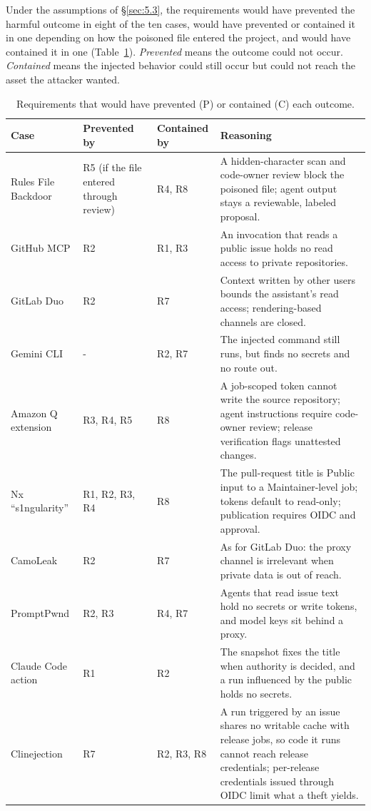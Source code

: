 \documentclass[acmsmall,screen,review]{acmart}
\begin{document}
Under the assumptions of \S\ref{sec:5.3}, the requirements would have prevented the harmful outcome in eight of the ten cases, would have prevented or contained it in one depending on how the poisoned file entered the project, and would have contained it in one (Table~\ref{tab:4}). \emph{Prevented} means the outcome could not occur. \emph{Contained} means the injected behavior could still occur but could not reach the asset the attacker wanted.

\begin{table}[htbp]
\caption{Requirements that would have prevented (P) or contained (C) each outcome.}
\label{tab:4}
\footnotesize
\begin{tabularx}{\linewidth}{@{}>{\hsize=0.751\hsize\raggedright\arraybackslash}X>{\hsize=0.588\hsize\raggedright\arraybackslash}X>{\hsize=0.588\hsize\raggedright\arraybackslash}X>{\hsize=2.073\hsize\raggedright\arraybackslash}X@{}}
\toprule
\textbf{Case} & \textbf{Prevented by} & \textbf{Contained by} & \textbf{Reasoning} \\
\midrule
Rules File Backdoor & R5 (if the file entered through review) & R4, R8 & A hidden-character scan and code-owner review block the poisoned file; agent output stays a reviewable, labeled proposal. \\
GitHub MCP & R2 & R1, R3 & An invocation that reads a public issue holds no read access to private repositories. \\
GitLab Duo & R2 & R7 & Context written by other users bounds the assistant's read access; rendering-based channels are closed. \\
Gemini CLI & - & R2, R7 & The injected command still runs, but finds no secrets and no route out. \\
Amazon Q extension & R3, R4, R5 & R8 & A job-scoped token cannot write the source repository; agent instructions require code-owner review; release verification flags unattested changes. \\
Nx ``s1ngularity'' & R1, R2, R3, R4 & R8 & The pull-request title is Public input to a Maintainer-level job; tokens default to read-only; publication requires OIDC and approval. \\
CamoLeak & R2 & R7 & As for GitLab Duo: the proxy channel is irrelevant when private data is out of reach. \\
PromptPwnd & R2, R3 & R4, R7 & Agents that read issue text hold no secrets or write tokens, and model keys sit behind a proxy. \\
Claude Code action & R1 & R2 & The snapshot fixes the title when authority is decided, and a run influenced by the public holds no secrets. \\
Clinejection & R7 & R2, R3, R8 & A run triggered by an issue shares no writable cache with release jobs, so code it runs cannot reach release credentials; per-release credentials issued through OIDC limit what a theft yields. \\
\bottomrule
\end{tabularx}
\end{table}
\end{document}
